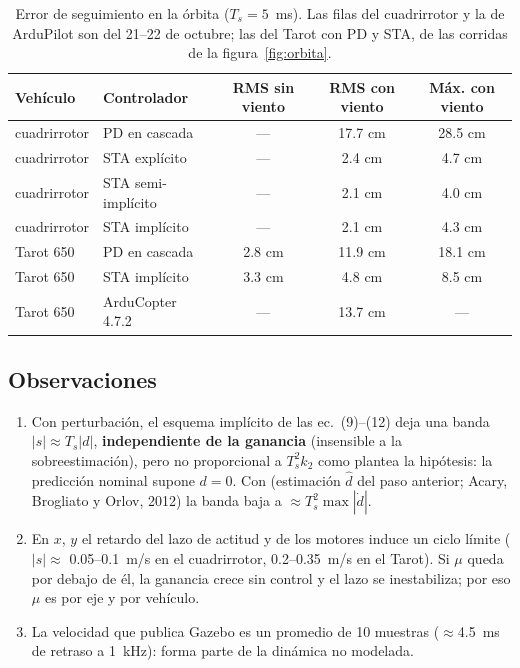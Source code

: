 \begin{table}[H]
\centering\small
\begin{tabular}{llccc}
\toprule
\textbf{Vehículo} & \textbf{Controlador} & \textbf{RMS sin viento} & \textbf{RMS con viento} & \textbf{Máx. con viento} \\ \midrule
cuadrirrotor & PD en cascada & --- & 17.7 cm & 28.5 cm \\
cuadrirrotor & STA explícito & --- & 2.4 cm & 4.7 cm \\
cuadrirrotor & STA semi-implícito & --- & 2.1 cm & 4.0 cm \\
cuadrirrotor & STA implícito & --- & 2.1 cm & 4.3 cm \\
Tarot 650 & PD en cascada & 2.8 cm & 11.9 cm & 18.1 cm \\
Tarot 650 & STA implícito & 3.3 cm & 4.8 cm & 8.5 cm \\
Tarot 650 & ArduCopter 4.7.2 & --- & 13.7 cm & --- \\
\bottomrule
\end{tabular}
\caption{Error de seguimiento en la órbita ($T_s = 5$~ms). Las filas del cuadrirrotor y la de
ArduPilot son del 21--22 de octubre; las del Tarot con PD y STA, de las corridas de la
figura~\ref{fig:orbita}.}
\end{table}

\subsection{Observaciones}
\label{sec:observaciones}

\begin{enumerate}
  \item Con perturbación, el esquema implícito de las ec.~(9)--(12) deja una banda
        $|s|\approx T_s|d|$, \textbf{independiente de la ganancia} (insensible a la
        sobreestimación), pero no proporcional a $T_s^2k_2$ como plantea la hipótesis: la predicción
        nominal supone $d=0$. Con  (estimación $\hat d$ del paso
        anterior; Acary, Brogliato y Orlov, 2012) la banda baja a $\approx T_s^2\max|\dot d|$.
  \item En $x$, $y$ el retardo del lazo de actitud y de los motores induce un ciclo límite
        ($|s|\approx$ 0.05--0.1~m/s en el cuadrirrotor, 0.2--0.35~m/s en el Tarot). Si $\mu$ queda
        por debajo de él, la ganancia crece sin control y el lazo se inestabiliza; por eso $\mu$
        es por eje y por vehículo.
  \item La velocidad que publica Gazebo es un promedio de 10 muestras ($\approx$4.5~ms de retraso
        a 1~kHz): forma parte de la dinámica no modelada.
\end{enumerate}

